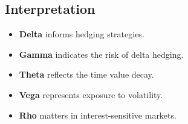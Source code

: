 \subsection*{Interpretation}
\begin{itemize}
  \item \textbf{Delta} informs hedging strategies.
  \item \textbf{Gamma} indicates the risk of delta hedging.
  \item \textbf{Theta} reflects the time value decay.
  \item \textbf{Vega} represents exposure to volatility.
  \item \textbf{Rho} matters in interest-sensitive markets.
\end{itemize}
